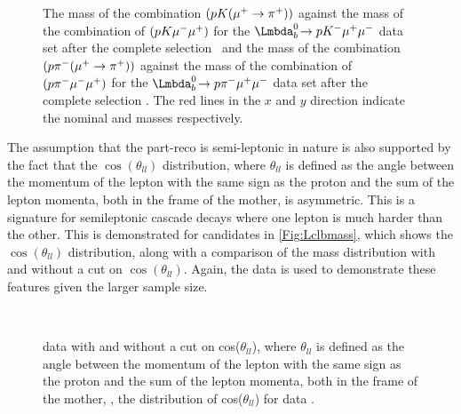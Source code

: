 \begin{figure}[!t]\def\nh{0.33\textwidth}
  \centering
  \textwidth
{}
 
\caption{The mass of the combination $(p{K}({\mu^+}\rightarrow{\ensuremath{{\pi}^+}}))$ against the mass of the combination of $(p{K}{\mu^-}{\mu^+})$ for the $\LbK$ data set after the complete selection~\protect{} and the mass of the combination $(p{{\pi}^-}({\mu^+}\rightarrow{\ensuremath{{\pi}^+}}))$ against the mass of the combination of $(p{{\pi}^-}{\mu^-}{\mu^+})$ for the $\Lbpi$ data set after the complete selection \protect{}. The red lines in the $x$ and $y$ direction indicate the nominal \Lc and \Lb masses respectively.}
\label{Fig:LcVsLb}
\end{figure}


The assumption that the part-reco is semi-leptonic in nature is also supported by the fact that the $\cos(\theta_{ll})$ distribution, where $\theta_{ll}$ is defined as the angle between the momentum of the lepton with the same sign as the proton and the sum of the lepton momenta, both in the frame of the \Lb mother, is asymmetric. This is a signature for semileptonic cascade decays where one lepton is much harder than the other.  This is demonstrated for \LbK candidates in \autoref{Fig:Lclbmass}, which shows the $\cos(\theta_{ll})$ distribution, along with a comparison of the mass distribution with and without a cut on $\cos(\theta_{ll})$. Again, the \LbK data is used to demonstrate these features given the larger sample size. 


\begin{figure}[!t]\def\nh{0.33\textwidth}
  \centering
 
  \textwidth\\ %
  \textwidth  

  
  \caption{\LbK data with and without a cut on cos($\theta_{ll}$), where $\theta_{ll}$ is defined as the angle between the momentum of the lepton with the same sign as the proton and the sum of the lepton momenta, both in the frame of the \Lb mother, \protect{}, the distribution of cos($\theta_{ll}$) for \LbK data \protect{}.}
  \label{Fig:Lclbmass}
\end{figure}

